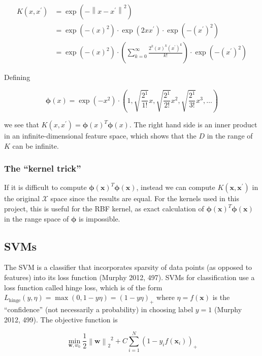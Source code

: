 \documentclass[letterpaper, 12pt]{article}
\newcommand{\norm}[1]{\left\lVert #1 \right\rVert}
\newcommand{\vect}[1]{\boldsymbol{#1}}
\begin{document}
\begin{align*}
  K(x, x^\prime) & = \exp\left(-\norm{x - x^\prime}^2\right) \\
  & = \exp\left(-(x)^2\right) \cdot \exp\left(2xx^\prime\right) \cdot \exp(-\left(x^\prime\right)^2) \\
  & = \exp\left(-(x)^2\right) \cdot \left(\sum_{k=0}^{\infty} \frac{2^k(x)^k\left(x^\prime\right)^k}{k!}\right) \cdot \exp\left(-\left(x^\prime\right)^2\right)
\end{align*}

Defining

\begin{equation*}
  \vect{\phi}(x) = \exp(-x^2) \cdot \left(1, \sqrt{\frac{2^1}{1!}}x, \sqrt{\frac{2^1}{2!}}x^2, \sqrt{\frac{2^1}{3!}}x^3, \ldots \right)
\end{equation*}

we see that $K(x, x^\prime) = \vect{\phi}(x)^T \vect{\phi}(x)$. The right hand side is an inner product in an infinite-dimensional feature space, which shows that the $D$ in the range of $K$ can be infinite.

\subsubsection{The ``kernel trick''}

If it is difficult to compute $\vect{\phi}(\vect{x})^T \vect{\phi}(\vect{x})$, instead we can compute $K(\vect{x}, \vect{x}^\prime)$ in the original $\mathcal{X}$ space since the results are equal. For the kernels used in this project, this is useful for the RBF kernel, as exact calculation of $\vect{\phi}(\vect{x})^T \vect{\phi}(\vect{x})$ in the range space of $\vect{\phi}$ is impossible. 

\subsection{SVMs}

The SVM is a classifier that incorporates sparsity of data points (as opposed to features) into its loss function (Murphy 2012, 497). SVMs for classification use a loss function called hinge loss, which is of the form $L_\text{hinge}(y, \eta) = \max(0, 1 - y \eta) = (1 - y\eta)_{+}$ where $\eta = f(\vect{x})$ is the ``confidence'' (not necessarily a probability) in choosing label $y = 1$ (Murphy 2012, 499). The objective function is

\begin{equation*}
  \min_{\vect{w}, w_0} \frac{1}{2}{\norm{\vect{w}}_2}^2 + C \sum_{i=1}^{N}(1 - y_i f(\vect{x}_i))_{+}
\end{equation*}
\end{document}
